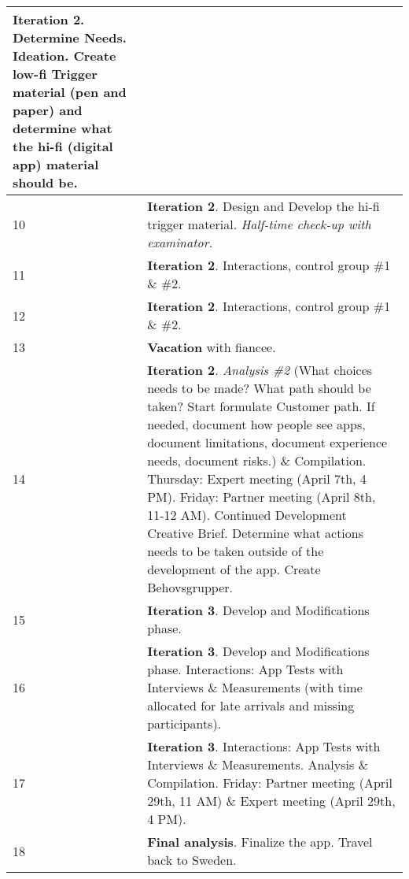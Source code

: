 \begin{center}
\begin{tabular}{ | l | p{10cm} |}
    \textbf{Iteration 2}. Determine Needs. Ideation. Create low-fi Trigger material (pen and paper) and determine what the hi-fi (digital app) material should be.
    \\ \hline
    10 & \textbf{Iteration 2}. Design and Develop the hi-fi trigger material. \textit{Half-time check-up with examinator.} \\ \hline
    11 & \textbf{Iteration 2}. Interactions, control group \#1 \& \#2. \\ \hline
    12 & \textbf{Iteration 2}. Interactions, control group \#1 \& \#2. %
    \\ \hline
    13 & \textbf{Vacation} with fiancee. \\ \hline
    14 & \textbf{Iteration 2}. \textit{Analysis \#2} (What choices needs to be made? What path should be taken? Start formulate Customer path. If needed, document how people see apps, document limitations, document experience needs, document risks.) %
    \& Compilation. Thursday: Expert meeting (April 7th, 4 PM). Friday: Partner meeting (April 8th, 11-12 AM). Continued Development Creative Brief. Determine what actions needs to be taken outside of the development of the app. Create Behovsgrupper. \\ \hline
    
    15 & \textbf{Iteration 3}. Develop and Modifications phase. \\ \hline
    16 & \textbf{Iteration 3}. Develop and Modifications phase. Interactions: App Tests with Interviews \& Measurements (with time allocated for late arrivals and missing participants). \\ \hline
    17 & \textbf{Iteration 3}. Interactions: App Tests with Interviews \& Measurements. 
    Analysis \& Compilation. 
    Friday: Partner meeting (April 29th, 11 AM) \& Expert meeting (April 29th, 4 PM). \\ \hline
    18 & \textbf{Final analysis}. Finalize the app. Travel back to Sweden. \\ \hline
    \end{tabular}
\end{center}

